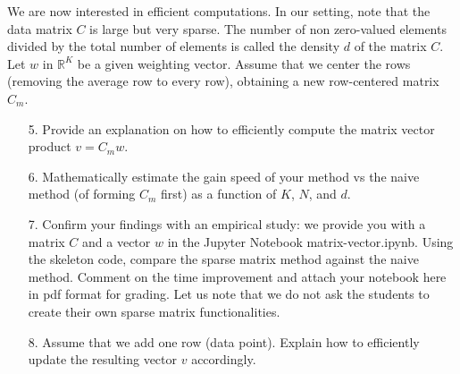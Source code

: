 \documentclass[11pt]{article}
\begin{document}
We are now interested in efficient computations. In our setting, note that the data matrix $C$ is large but very sparse. The number of non zero-valued elements divided by the total number of elements is called the density $d$ of the matrix $C$. Let $w$ in $\mathbb{R}^K$ be a given weighting vector. Assume that we center the rows (removing the average row to every row), obtaining a new row-centered matrix $C_m$.

\begin{enumerate}
    \item[5.] Provide an explanation on how to efficiently compute the matrix vector product $v = C_m w$.

    \item[6.] Mathematically estimate the gain speed of your method vs the naive method (of forming $C_m$ first) as a function of $K$, $N$, and $d$.

    \item[7.] Confirm your findings with an empirical study: we provide you with a matrix $C$ and a vector $w$ in the Jupyter Notebook matrix-vector.ipynb. Using the skeleton code, compare the sparse matrix method against the naive method. Comment on the time improvement and attach your notebook here in pdf format for grading. Let us note that we do not ask the students to create their own sparse matrix functionalities.

    \item[8.] Assume that we add one row (data point). Explain how to efficiently update the resulting vector $v$ accordingly.
\end{enumerate}

\begin{solution}
\end{solution}
\end{document}
